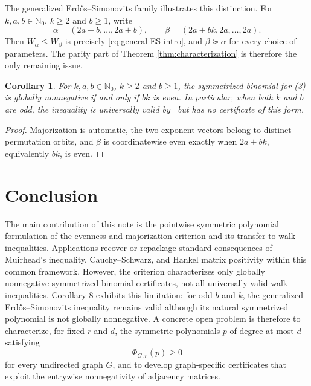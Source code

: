 \documentclass[11pt]{article}
\newtheorem{corollary}[definition]{Corollary}
\newcommand{\Nat}{\mathbb{N}}
\theoremstyle{remark}
\begin{document}
The generalized Erd\H{o}s--Simonovits family illustrates this distinction.  For $k, a,b\in\Nat_0$, $k \ge 2$ and $b\geq 1$, write
\[
  \alpha=(2a+b,\ldots,2a+b),
  \qquad
  \beta=(2a+bk,2a,\ldots,2a).
\]
Then $W_\alpha\leq W_\beta$ is precisely \eqref{eq:general-ES-intro}, and $\beta\succeq\alpha$ for every choice of
parameters.  The parity part of Theorem \ref{thm:characterization} is therefore the only remaining issue.

\begin{corollary}\label{cor:ES-boundary}
For $k, a,b\in\Nat_0$, $k \ge 2$ and $b\geq 1$, 
the symmetrized binomial for (3) is globally
nonnegative if and only if $bk$ is even.
In particular, when both $k$ and $b$ are odd, the inequality is
universally valid by~{\em \cite{taeubig-et-al-2013}} but has no certificate of this form.
\end{corollary}

\begin{proof}
Majorization is automatic, the two exponent vectors belong to distinct permutation orbits, and $\beta$ is coordinatewise even exactly when $2a+bk$, equivalently $bk$, is even.
\end{proof}


\section{Conclusion}




The main contribution of this note is the pointwise symmetric polynomial formulation of the evenness-and-majorization criterion and its transfer to walk inequalities.
Applications recover or repackage standard consequences of Muirhead’s inequality, Cauchy–Schwarz, and Hankel matrix positivity within this common framework.
However, the criterion characterizes only globally nonnegative symmetrized binomial certificates, not all universally valid walk inequalities. Corollary 8 exhibits this limitation: for odd $b$ and $k$, the generalized Erdős–Simonovits inequality remains valid although its natural symmetrized polynomial is not globally nonnegative. A concrete open problem is therefore to characterize, for fixed $r$ and $d$, the symmetric polynomials $p$ of degree at most $d$ satisfying
\[
\Phi_{G,r}(p)\geq0
\]
for every undirected graph $G$, and to develop graph-specific certificates that exploit the entrywise nonnegativity of adjacency matrices.
\end{document}
